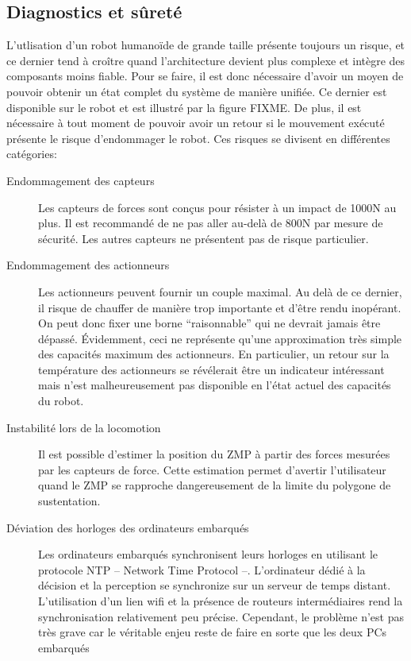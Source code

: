 \subsection{Diagnostics et sûreté}

L'utlisation d'un robot humanoïde de grande taille présente toujours
un risque, et ce dernier tend à croître quand l'architecture devient
plus complexe et intègre des composants moins fiable. Pour se faire,
il est donc nécessaire d'avoir un moyen de pouvoir obtenir un état
complet du système de manière unifiée. Ce dernier est disponible sur
le robot et est illustré par la figure FIXME. De plus, il est
nécessaire à tout moment de pouvoir avoir un retour si le mouvement
exécuté présente le risque d'endommager le robot. Ces risques se
divisent en différentes catégories:
\begin{description}
\item[Endommagement des capteurs] Les capteurs de forces sont conçus
  pour résister à un impact de 1000N au plus. Il est recommandé de ne
  pas aller au-delà de 800N par mesure de sécurité. Les autres
  capteurs ne présentent pas de risque particulier.
\item[Endommagement des actionneurs] Les actionneurs peuvent fournir
  un couple maximal. Au delà de ce dernier, il risque de chauffer de
  manière trop importante et d'être rendu inopérant. On peut donc
  fixer une borne ``raisonnable'' qui ne devrait jamais être
  dépassé. Évidemment, ceci ne représente qu'une approximation très
  simple des capacités maximum des actionneurs. En particulier, un
  retour sur la température des actionneurs se révélerait être un
  indicateur intéressant mais n'est malheureusement pas disponible en
  l'état actuel des capacités du robot.
\item[Instabilité lors de la locomotion] Il est possible d'estimer la
  position du ZMP à partir des forces mesurées par les capteurs de
  force. Cette estimation permet d'avertir l'utilisateur quand le ZMP
  se rapproche dangereusement de la limite du polygone de
  sustentation.
\item[Déviation des horloges des ordinateurs embarqués] Les
  ordinateurs embarqués synchronisent leurs horloges en utilisant le
  protocole NTP -- Network Time Protocol --. L'ordinateur dédié à la
  décision et la perception se synchronize sur un serveur de temps
  distant. L'utilisation d'un lien wifi et la présence de routeurs
  intermédiaires rend la synchronisation relativement peu
  précise. Cependant, le problème n'est pas très grave car le
  véritable enjeu reste de faire en sorte que les deux PCs embarqués

\end{description}
